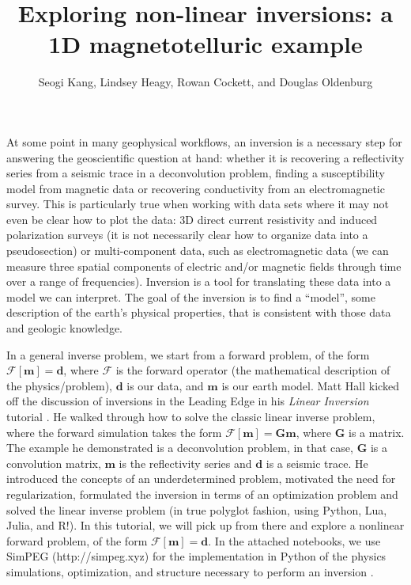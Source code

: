 \documentclass[11pt,oneside]{article}
\begin{document}
\title{Exploring non-linear inversions: a 1D magnetotelluric example}
\author{Seogi Kang, Lindsey Heagy, Rowan Cockett, and Douglas Oldenburg}

\maketitle
At some point in many geophysical workflows, an inversion is a necessary step for answering the geoscientific question at hand: whether it is recovering a reflectivity series from a seismic trace in a deconvolution problem, finding a susceptibility model from magnetic data or recovering conductivity from an electromagnetic survey. This is particularly true when working with data sets where it may not even be clear how to plot the data: 3D direct current resistivity and induced polarization surveys (it is not necessarily clear how to organize data into a pseudosection) or multi-component data, such as electromagnetic data (we can measure three spatial components of electric and/or magnetic fields through time over a range of frequencies). Inversion is a tool for translating these data into a model we can interpret. The goal of the inversion is to find a ``model'', some description of the earth’s physical properties, that is consistent with those data and geologic knowledge.

In a general inverse problem, we start from a forward problem, of the form $\mathcal{F}[\mathbf{m}] = \mathbf{d}$, where $\mathcal{F}$ is the forward operator (the mathematical description of the physics/problem), $\mathbf{d}$ is our data, and $\mathbf{m}$ is our earth model. Matt Hall kicked off the discussion of inversions in the Leading Edge in his \emph{Linear Inversion} tutorial \citep{HallTutorial}. He walked through how to solve the classic linear inverse problem, where the forward simulation takes the form $\mathcal{F}[\mathbf{m}] = \mathbf{G}\mathbf{m}$, where $\mathbf{G}$ is a matrix. The example he demonstrated is a deconvolution problem, in that case, $\mathbf{G}$ is a convolution matrix, $\mathbf{m}$ is the reflectivity series and $\mathbf{d}$ is a seismic trace. He introduced the concepts of an underdetermined problem, motivated the need for regularization, formulated the inversion in terms of an optimization problem and solved the linear inverse problem (in true polyglot fashion, using Python, Lua, Julia, and R!). In this tutorial, we will pick up from there and explore a nonlinear forward problem, of the form $\mathcal{F}[\mathbf{m}] = \mathbf{d}$. In the attached notebooks, we use SimPEG (http://simpeg.xyz) for the implementation in Python of the physics simulations, optimization, and structure necessary to perform an inversion \citep{SimPEGPaper}.
\end{document}

